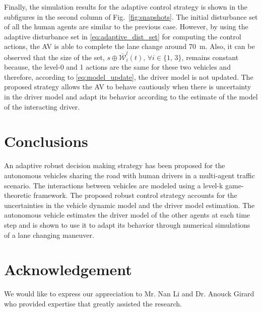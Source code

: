 \documentclass[10pt,journal]{IEEEtran}
\begin{document}
	Finally, the simulation results for the adaptive control strategy is shown in the subfigures in the second column of Fig.~\ref{fig:snapshots}. The initial disturbance set of all the human agents are similar to the previous case. However, by using the adaptive disturbance set in \eqref{eq:adaptive_dist_set} for computing the control actions, the AV is able to complete the lane change around \SI{70}{m}. Also, it can be observed that the size of the set, $s \oplus \bar{\mathcal{W}}_{i}^{l}(t), \, \forall i \in \{1,\,3\}$, remains constant because, the level-0 and 1 actions are the same for these two vehicles and therefore, according to \eqref{eq:model_update}, the driver model is not updated. The proposed strategy allows the AV to behave cautiously when there is uncertainty in the driver model and adapt its behavior according to the estimate of the model of the interacting driver.

	
	
	
	\section{Conclusions}
	\label{sec:conclusions}

	An adaptive robust decision making strategy has been proposed for the autonomous vehicles sharing the road with human drivers in a multi-agent traffic scenario. The interactions between vehicles are modeled using a level-k game-theoretic framework. The proposed robust control strategy accounts for the uncertainties in the vehicle dynamic model and the driver model estimation. The autonomous vehicle estimates the driver model of the other agents at each time step and is shown to use it to adapt its behavior through numerical simulations of a lane changing maneuver. 
	


	\section*{Acknowledgement}

	We would like to express our appreciation to Mr. Nan Li and Dr. Anouck Girard who provided expertise that greatly assisted the research.



\end{document}
